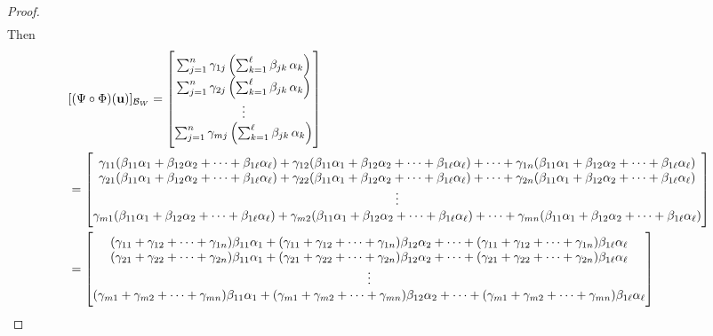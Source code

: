 \documentclass[11pt,openany]{article}
\renewcommand{\vec}[1]{\mathbf{#1}}
\begin{document}
\begin{observation}
\begin{proof}
\begin{align*}
\end{align*}
Then
\begin{align*} &[(\Psi\circ\Phi)(\vec{u})]_{\basis_W}
	=\begin{bmatrix}
	\sum_{j=1}^{n} \gamma_{1j} \left(\sum_{k=1}^{\ell} \beta_{jk}\,\alpha_k\right) \\
	\sum_{j=1}^{n} \gamma_{2j} \left(\sum_{k=1}^{\ell} \beta_{jk}\,\alpha_k\right) \\
	\vdots \\
	\sum_{j=1}^{n} \gamma_{mj} \left(\sum_{k=1}^{\ell} \beta_{jk}\,\alpha_k\right)
\end{bmatrix}\\
&=\begin{bmatrix}
	\gamma_{11}(\beta_{11}\alpha_1+\beta_{12}\alpha_2+\cdots+\beta_{1\ell}\alpha_\ell) + \gamma_{12}(\beta_{11}\alpha_1+\beta_{12}\alpha_2+\cdots+\beta_{1\ell}\alpha_\ell) +\cdots +\gamma_{1n}(\beta_{11}\alpha_1+\beta_{12}\alpha_2+\cdots+\beta_{1\ell}\alpha_\ell) \\
	\gamma_{21}(\beta_{11}\alpha_1+\beta_{12}\alpha_2+\cdots+\beta_{1\ell}\alpha_\ell) + \gamma_{22}(\beta_{11}\alpha_1+\beta_{12}\alpha_2+\cdots+\beta_{1\ell}\alpha_\ell) +\cdots +\gamma_{2n}(\beta_{11}\alpha_1+\beta_{12}\alpha_2+\cdots+\beta_{1\ell}\alpha_\ell) \\
	\vdots \\
	\gamma_{m1}(\beta_{11}\alpha_1+\beta_{12}\alpha_2+\cdots+\beta_{1\ell}\alpha_\ell) + \gamma_{m2}(\beta_{11}\alpha_1+\beta_{12}\alpha_2+\cdots+\beta_{1\ell}\alpha_\ell) +\cdots +\gamma_{mn}(\beta_{11}\alpha_1+\beta_{12}\alpha_2+\cdots+\beta_{1\ell}\alpha_\ell)
\end{bmatrix} \\
&=\begin{bmatrix}
	(\gamma_{11}+\gamma_{12}+\cdots+\gamma_{1n})\beta_{11}\alpha_1 + (\gamma_{11}+\gamma_{12}+\cdots+\gamma_{1n})\beta_{12}\alpha_2 + \cdots + (\gamma_{11}+\gamma_{12}+\cdots+\gamma_{1n})\beta_{1\ell}\alpha_\ell\\
	(\gamma_{21}+\gamma_{22}+\cdots+\gamma_{2n})\beta_{11}\alpha_1 + (\gamma_{21}+\gamma_{22}+\cdots+\gamma_{2n})\beta_{12}\alpha_2 + \cdots + (\gamma_{21}+\gamma_{22}+\cdots+\gamma_{2n})\beta_{1\ell}\alpha_\ell\\
	\vdots\\
	(\gamma_{m1}+\gamma_{m2}+\cdots+\gamma_{mn})\beta_{11}\alpha_1 + (\gamma_{m1}+\gamma_{m2}+\cdots+\gamma_{mn})\beta_{12}\alpha_2 + \cdots + (\gamma_{m1}+\gamma_{m2}+\cdots+\gamma_{mn})\beta_{1\ell}\alpha_\ell
\end{bmatrix}\\

\end{align*}
\end{proof}
\end{observation}
\end{document}
